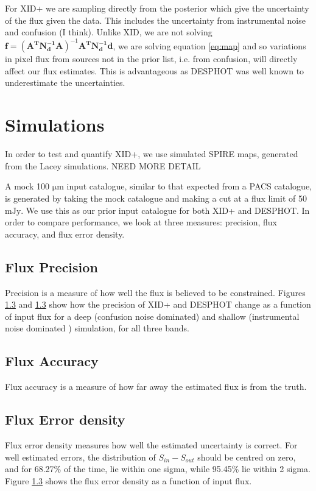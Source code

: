 \documentclass[useAMS,usenatbib]{mn2e}
\begin{document}
For XID+ we are sampling directly from the posterior which give the uncertainty of the flux given the data. This includes the uncertainty from instrumental noise and confusion (I think). Unlike XID, we are not solving $\mathbf{f}=(\mathbf{A^TN_d^{-1}A})^{-1}\mathbf{A^TN_d^{-1}d}$, we are solving equation \ref{eq:map} and so variations in pixel flux from sources not in the prior list, i.e. from confusion, will directly affect our flux estimates. This is advantageous as DESPHOT was well known to underestimate the uncertainties.


\section{Simulations}
In order to test and quantify XID+, we use simulated SPIRE maps, generated from the Lacey simulations. NEED MORE DETAIL

A mock 100 $\mathrm{\mu m}$ input catalogue, similar to that expected from a PACS catalogue, is generated by taking the mock catalogue and making a cut at a flux limit of 50 $\mathrm{mJy}$. We use this as our prior input catalogue for both XID+ and DESPHOT. In order to compare performance, we look at three measures: precision, flux accuracy, and flux error density.

\subsection{Flux Precision}
Precision is a measure of how well the flux is believed to be constrained. Figures \ref{} and \ref{} show how the precision of XID+ and DESPHOT change as a function of input flux for a deep (confusion noise dominated) and shallow (instrumental noise dominated ) simulation, for all three bands. 

\subsection{Flux Accuracy}
Flux accuracy is a measure of how far away the estimated flux is from the truth.


\subsection{Flux Error density}
Flux error density measures how well the estimated uncertainty is correct. For well estimated errors, the distribution of $S_{in} - S_{out}$ should be centred on zero, and for 68.27\% of the time, lie within one sigma, while 95.45\% lie within 2 sigma. Figure \ref{} shows the flux error density as a function of input flux. 
\end{document}
